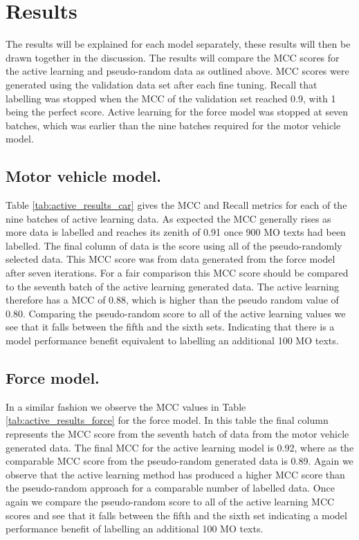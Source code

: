 \section{Results} The results will be explained for each model separately, these results will then be drawn together in the discussion. The results will compare the MCC scores for the active learning and pseudo-random data as outlined above. MCC scores were generated using the validation data set after each fine tuning. Recall that labelling was stopped when the MCC of the validation set reached 0.9, with 1 being the perfect score. Active learning for the force model was stopped at seven batches, which was earlier than the nine batches required for the motor vehicle model.

\subsection{Motor vehicle model.} Table \ref{tab:active_results_car} gives the MCC and Recall metrics for each of the nine batches of active learning data. As expected the MCC generally rises as more data is labelled and reaches its zenith of 0.91 once 900 MO texts had been labelled. The final column of data is the score using all of the pseudo-randomly selected data. This MCC score was from data generated from the force model after seven iterations. For a fair comparison this MCC score should be compared to the seventh batch of the active learning generated data. The active learning therefore has a MCC of 0.88, which is higher than the pseudo random value of 0.80. Comparing the pseudo-random score to all of the active learning values we see that it falls between the fifth and the sixth sets. Indicating that there is a model performance benefit equivalent to labelling an additional 100 MO texts.

\subsection{Force model.} In a similar fashion we observe the MCC values in Table \ref{tab:active_results_force} for the force model. In this table the final column represents the MCC score from the seventh batch of data from the motor vehicle generated data. The final MCC for the active learning model is 0.92, where as the comparable MCC score from the pseudo-random generated data is 0.89. Again we observe that the active learning method has produced a higher MCC score than the pseudo-random approach for a comparable number of labelled data.  Once again we compare the pseudo-random score to all of the active learning MCC scores and see that it falls between the fifth and the sixth set indicating a model performance benefit of labelling an additional 100 MO texts.





